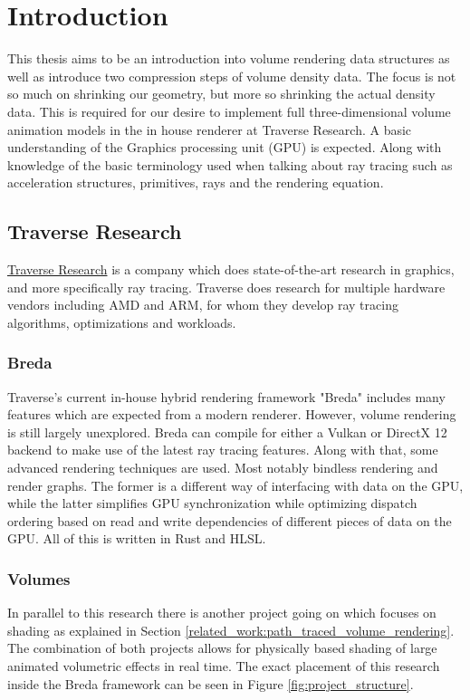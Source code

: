 \section{Introduction} \label{introduction}
This thesis aims to be an introduction into volume rendering data structures as well as introduce two compression steps of volume density data. The focus is not so much on shrinking our geometry, but more so shrinking the actual density data. This is required for our desire to implement full three-dimensional volume animation models in the in house renderer at Traverse Research. A basic understanding of the Graphics processing unit (GPU) is expected. Along with knowledge of the basic terminology used when talking about ray tracing such as acceleration structures, primitives, rays and the rendering equation.


\subsection{Traverse Research} \label{introduction:traverse_research}
\href{https://traverseresearch.nl/}{Traverse Research} is a company which does state-of-the-art research in graphics, and more specifically ray tracing. Traverse does research for multiple hardware vendors including AMD and ARM, for whom they develop ray tracing algorithms, optimizations and workloads.
\subsubsection{Breda} \label{introduction:traverse_research:breda}
Traverse's current in-house hybrid rendering framework "Breda" includes many features which are expected from a modern renderer. However, volume rendering is still largely unexplored. Breda can compile for either a Vulkan or DirectX 12 backend to make use of the latest ray tracing features. Along with that, some advanced rendering techniques are used. Most notably bindless rendering\cite{BindlessRenderingSetup} and render graphs\cite{RenderGraph101}. The former is a different way of interfacing with data on the GPU, while the latter simplifies GPU synchronization while optimizing dispatch ordering based on read and write dependencies of different pieces of data on the GPU. All of this is written in Rust and HLSL.
\subsubsection{Volumes} \label{introduction:traverse_research:volumes}
In parallel to this research there is another project going on which focuses on shading as explained in Section \ref{related_work:path_traced_volume_rendering}. The combination of both projects allows for physically based shading of large animated volumetric effects in real time. The exact placement of this research inside the Breda framework can be seen in Figure \ref{fig:project_structure}.

